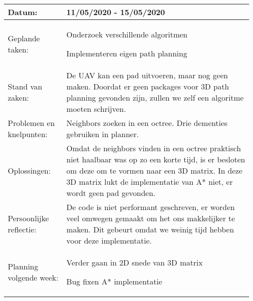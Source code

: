 \begin{tabularx}{\textwidth}{| l | X |}
  \hline
  Datum: & 11/05/2020 - 15/05/2020\\
  \hline
  Geplande taken: &
  \begin{compactitem}
    \item Onderzoek verschillende algoritmen
    \item Implementeren eigen path planning
  \end{compactitem}\\
  \hline
  Stand van zaken: & De UAV kan een pad uitvoeren, maar nog geen maken. Doordat er geen packages voor 3D path planning gevonden zijn, zullen we zelf een algoritme moeten schrijven.\\
  \hline
  Problemen en knelpunten: & Neighbors zoeken in een octree. Drie dementies gebruiken in planner.\\
  \hline
  Oplossingen: & Omdat de neighbors vinden in een octree praktisch niet haalbaar was op zo een korte tijd, is er besloten om deze om te vormen naar een 3D matrix. In deze 3D matrix lukt de implementatie van A* niet, er wordt geen pad gevonden.\\
  \hline
  Persoonlijke reflectie: & De code is niet performant geschreven, er worden veel omwegen gemaakt om het ons makkelijker te maken. Dit gebeurt omdat we weinig tijd hebben voor deze implementatie.\\
  \hline
  Planning volgende week: &
  \begin{compactitem}
    \item Verder gaan in 2D snede van 3D matrix
    \item Bug fixen A* implementatie
  \end{compactitem}\\
  \hline
\end{tabularx}